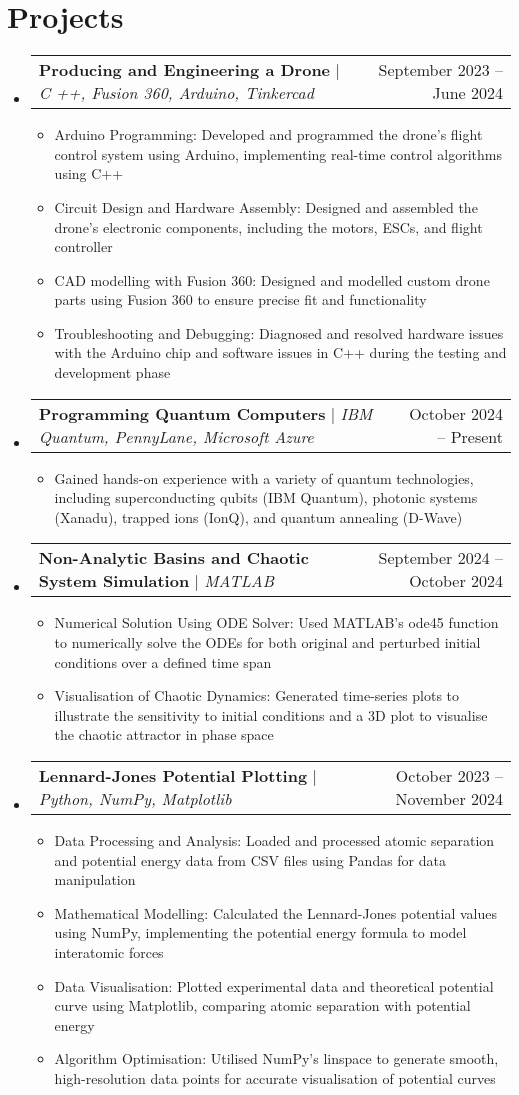\documentclass[letterpaper,11pt]{article}
\makeatletter
\newcommand{\resumeItem}[1]{
  \item\small{
    {#1 \vspace{-2pt}}
  }
}
\newcommand{\resumeProjectHeading}[2]{
    \item
    \begin{tabular*}{0.97\textwidth}{l@{\extracolsep{\fill}}r}
      \small#1 & #2 \\
    \end{tabular*}\vspace{-7pt}
}
\newcommand{\resumeSubHeadingListStart}{\begin{itemize}[leftmargin=0.15in, label={}]}
\newcommand{\resumeSubHeadingListEnd}{\end{itemize}}
\newcommand{\resumeItemListStart}{\begin{itemize}}
\newcommand{\resumeItemListEnd}{\end{itemize}\vspace{-5pt}}
\makeatother
\begin{document}
\section{Projects}
    \resumeSubHeadingListStart
          \resumeProjectHeading
          {\textbf{Producing and Engineering a Drone} $|$ \emph{C ++, Fusion 360, Arduino, Tinkercad}}{September 2023 -- June 2024}
          \resumeItemListStart
            \resumeItem{Arduino Programming: Developed and programmed the drone’s flight control system using Arduino, implementing real-time control algorithms using C++}
            \resumeItem{Circuit Design and Hardware Assembly: Designed and assembled the drone’s electronic components, including the motors, ESCs, and flight controller}
            \resumeItem{CAD modelling with Fusion 360: Designed and modelled custom drone parts using Fusion 360 to ensure precise fit and functionality }
            \resumeItem{Troubleshooting and Debugging: Diagnosed and resolved hardware issues with the Arduino chip and software issues in C++ during the testing and development phase}
          \resumeItemListEnd
          \resumeProjectHeading
          {\textbf{Programming Quantum Computers} $|$ \emph{IBM Quantum, PennyLane, Microsoft Azure}}{October 2024 -- Present}
          \resumeItemListStart
            \resumeItem{Gained hands-on experience with a variety of quantum technologies, including superconducting qubits (IBM Quantum), photonic systems (Xanadu), trapped ions (IonQ), and quantum annealing (D-Wave)}
          \resumeItemListEnd
            \resumeProjectHeading
          {\textbf{Non-Analytic Basins and Chaotic System Simulation} $|$ \emph{MATLAB}}{September 2024 -- October 2024}
          \resumeItemListStart
            \resumeItem{Numerical Solution Using ODE Solver: Used MATLAB’s ode45 function to numerically solve the ODEs for both original and perturbed initial conditions over a defined time span}
            \resumeItem{Visualisation of Chaotic Dynamics: Generated time-series plots to illustrate the sensitivity to initial conditions and a 3D plot to visualise the chaotic attractor in phase space}
          \resumeItemListEnd
      \resumeProjectHeading
          {\textbf{Lennard-Jones Potential Plotting} $|$ \emph{Python, NumPy, Matplotlib}}{October 2023 -- November 2024}
          \resumeItemListStart
            \resumeItem{Data Processing and Analysis: Loaded and processed atomic separation and potential energy data from CSV files using Pandas for data manipulation}
            \resumeItem{Mathematical Modelling: Calculated the Lennard-Jones potential values using NumPy, implementing the potential energy formula to model interatomic forces}
            \resumeItem{Data Visualisation: Plotted experimental data and theoretical potential curve using Matplotlib, comparing atomic separation with potential energy}
            \resumeItem{Algorithm Optimisation: Utilised NumPy's linspace to generate smooth, high-resolution data points for accurate visualisation of potential curves}
          \resumeItemListEnd
    \resumeSubHeadingListEnd
\end{document}
